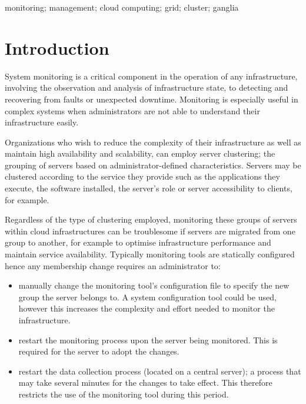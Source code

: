 \documentclass[10pt, conference, compsocconf]{IEEEtran}
\begin{document}
\begin{IEEEkeywords}
monitoring; management; cloud computing; grid; cluster; ganglia
\end{IEEEkeywords}

\IEEEpeerreviewmaketitle

\section{Introduction}
System monitoring is a critical component in the operation of any infrastructure, involving the observation and analysis of infrastructure state, to detecting and recovering from faults or unexpected downtime. Monitoring is especially useful in complex systems when administrators are not able to understand their infrastructure easily. 

Organizations who wish to reduce the complexity of their infrastructure as well as maintain high availability and scalability, can employ server clustering; the grouping of servers based on administrator-defined characteristics. Servers may be clustered according to the service they provide such as the applications they execute, the software installed, the server's role or server accessibility to clients, for example.

Regardless of the type of clustering employed, monitoring these groups of servers within cloud infrastructures can be troublesome if servers are migrated from one group to another, for example to optimise infrastructure performance and maintain service availability. Typically monitoring tools are statically configured hence any membership change requires an administrator to:

\begin{itemize}
\item manually change the monitoring tool's configuration file to specify the new group the server belongs to. A system configuration tool could be used, however this increases the complexity and effort needed to monitor the infrastructure. 
\item restart the monitoring process upon the server being monitored. This is required for the server to adopt the changes.
\item restart the data collection process (located on a central server); a process that may take several minutes for the changes to take effect. This therefore restricts the use of the monitoring tool during this period.
\end{itemize}
\end{document}
